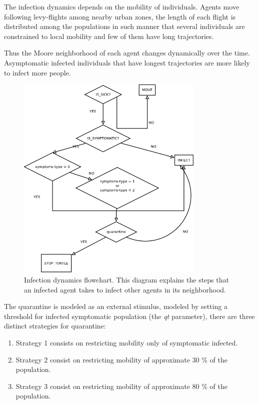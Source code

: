 \documentclass[11pt,a4paper,reqno]{amsart}
\theoremstyle{definition}
\theoremstyle{remark}
\begin{document}
The infection dynamics depends on the mobility of individuals. Agents move following levy-flights among nearby urban zones, the length of each flight is distributed among the populations in such manner that several individuals are constrained to local mobility and few of them have long trajectories.



Thus the Moore neighborhood of each agent changes dynamically over the time. Asymptomatic infected individuals that have longest trajectories are more likely to infect more people. 

\begin{figure}[H]
    \centering
    \includegraphics[width=0.8\textwidth]{Infect.png}
    \caption{Infection dynamics flowchart. This diagram explains the steps that an infected agent takes to infect other agents in its neighborhood.}
    \label{infect}
\end{figure}

The quarantine is modeled as an external stimulus, modeled by setting a threshold for infected symptomatic population (the {\it qt } parameter), there are three distinct strategies for quarantine:

\begin{enumerate}
    \item Strategy 1 consists on restricting mobility only of symptomatic infected.
\item Strategy 2 consist on restricting mobility of approximate 30 \% of the population.
\item Strategy 3 consist on restricting mobility of approximate 80 \% of the population.
\end{enumerate}
\end{document}
